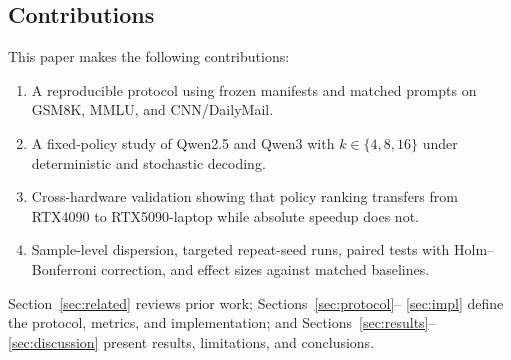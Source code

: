 \subsection{Contributions}
\label{sec:contributions}

This paper makes the following contributions:
\begin{enumerate}\itemsep0pt
  \item A reproducible protocol using frozen manifests and matched prompts on
        GSM8K, MMLU, and CNN/DailyMail.
  \item A fixed-policy study of Qwen2.5 and Qwen3 with
        $k\in\{4,8,16\}$ under deterministic and stochastic decoding.
  \item Cross-hardware validation showing that policy ranking transfers from
        RTX4090 to RTX5090-laptop while absolute speedup does not.
  \item Sample-level dispersion, targeted repeat-seed runs, paired tests with
        Holm--Bonferroni correction, and effect sizes against matched baselines.
\end{enumerate}

Section~\ref{sec:related} reviews prior work; Sections~\ref{sec:protocol}--
\ref{sec:impl} define the protocol, metrics, and implementation; and
Sections~\ref{sec:results}--\ref{sec:discussion} present results, limitations,
and conclusions.
